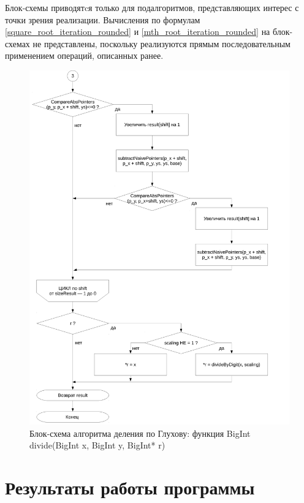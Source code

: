 \documentclass[a4paper,12pt]{article} %
\begin{document}
Блок-схемы приводятcя только для подалгоритмов, представляющих интерес с точки зрения реализации.
Вычисления по формулам \eqref{square_root_iteration_rounded} и \eqref{mth_root_iteration_rounded}
на блок-схемах не представлены,
поскольку реализуются прямым последовательным применением операций, описанных ранее.


\begin{figure}[ht]
	\includegraphics[width=\textwidth]{lr3_divide-3.pdf}
	\caption{Блок-схема алгоритма деления по Глухову: функция BigInt divide(BigInt x, BigInt y, BigInt* r)}
\end{figure}


\clearpage

\section*{Результаты работы программы}
\end{document}
